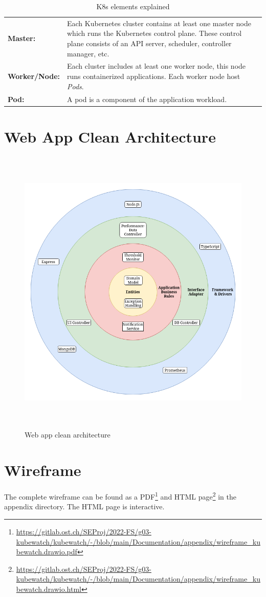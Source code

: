 \begin{table}[H]
  \begin{tabular*}{\textwidth}{p{3.5cm} | p{9cm}}
    \textbf{Master:}
      & Each Kubernetes cluster contains at least one master node which runs the Kubernetes control plane. These control plane consists of an API server, scheduler, controller manager, etc. \bigskip \\
    \textbf{Worker/Node:}
      & Each cluster includes at least one worker node, this node runs containerized applications. Each worker node host \textit{Pods}. \bigskip \\
    \textbf{Pod:}
      & A pod is a component of the application workload. \\
  \end{tabular*}
  \caption{K8s elements explained}
  \label{tab:k8s-elements-explained}
\end{table}

\section{Web App Clean Architecture}
\begin{figure}[H]
  \centering
  \includegraphics[height=14cm]{resources/clean_architecture.png}
  \caption{Web app clean architecture}
  \label{fig:web-app-architecture}
\end{figure}

\section{Wireframe}

The complete wireframe can be found as a PDF\footnote{\url{https://gitlab.ost.ch/SEProj/2022-FS/g03-kubewatch/kubewatch/-/blob/main/Documentation/appendix/wireframe_kubewatch.drawio.pdf}} and HTML page\footnote{\url{https://gitlab.ost.ch/SEProj/2022-FS/g03-kubewatch/kubewatch/-/blob/main/Documentation/appendix/wireframe_kubewatch.drawio.html}} in the appendix directory.
The HTML page is interactive.

